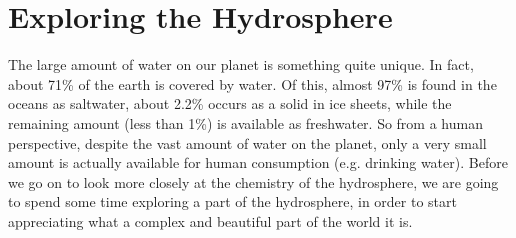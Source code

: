 



\section{Exploring the Hydrosphere}
\label{sec:hydro:exploring}

The large amount of water on our planet is something quite unique. In fact, about 71\% of the earth is covered by water. Of this, almost 97\% is found in the oceans as saltwater, about 2.2\% occurs as a solid in ice sheets, while the remaining amount (less than 1\%) is available as freshwater. So from a human perspective, despite the vast amount of water on the planet, only a very small amount is actually available for human consumption (e.g. drinking water). Before we go on to look more closely at the chemistry of the hydrosphere, we are going to spend some time exploring a part of the hydrosphere, in order to start appreciating what a complex and beautiful part of the world it is.

